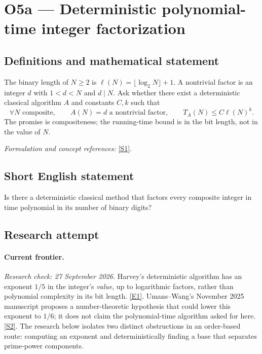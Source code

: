 \documentclass[11pt,a4paper]{article}
\newcommand{\sref}[2]{\hyperlink{source:#1:#2}{[S#2]}}
\newcommand{\eref}[2]{\hyperlink{extra:#1:#2}{[E#2]}}
\newif\ifshowcatalogue
\newcommand{\cataloguescope}[1]{\ifshowcatalogue
 \paragraph{Exact scope in the supplied catalogue.}
 \begin{quote}\small #1\end{quote}\fi}
\begin{document}
\setcounter{section}{0}
\clearpage
\section*{\texorpdfstring{O5a — Deterministic polynomial-time integer factorization}{O5a — Deterministic polynomial-time integer factorization}}\label{8400004}
\subsection{Definitions and mathematical statement}
The binary length of $N\ge2$ is $\ell(N)=\lfloor\log_2N\rfloor+1$. A nontrivial factor is an integer $d$ with $1<d<N$ and $d\mid N$. Ask whether there exist a deterministic classical algorithm $A$ and constants $C,k$ such that
\[
 \forall N\text{ composite},\qquad A(N)=d\text{ a nontrivial factor},\qquad
 T_A(N)\le C\ell(N)^k.
\]
The promise is compositeness; the running-time bound is in the bit length, not in the value of $N$.
\par\smallskip\textit{Formulation and concept references:} \sref{8400004}{1}.
\cataloguescope{Determine whether there is a deterministic classical algorithm that, on input a composite integer N in binary, outputs a nontrivial factor of N in time polynomial in log N.}
\subsection{Short English statement}
Is there a deterministic classical method that factors every composite integer in time polynomial in its number of binary digits?
\subsection{Research attempt}
\paragraph{Current frontier.}
\textit{Research check: 27 September 2026.}
Harvey's deterministic algorithm has an exponent $1/5$ in the integer's
\emph{value}, up to logarithmic factors, rather than polynomial complexity
in its bit length. \eref{8400004}{1}. Umans--Wang's November 2025 manuscript
proposes a number-theoretic hypothesis that could lower this exponent to
$1/6$; it does not claim the polynomial-time algorithm asked for here.
\sref{8400004}{2}. The research below isolates two distinct obstructions in an
order-based route: computing an exponent and deterministically finding a
base that separates prime-power components.
\end{document}
